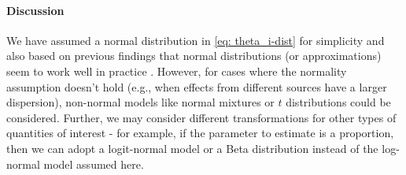 \documentclass{article}
\begin{document}
\paragraph{Discussion} 
We have assumed a normal distribution in \eqref{eq: theta_i-dist} for simplicity and 
also based on previous findings that normal distributions (or approximations) seem to work well in practice \citep{schuemie2018empirical,mulgrave2020bayesian}. 
However, for cases where the normality assumption doesn't hold (e.g., when effects from different sources have a larger dispersion), 
non-normal models like normal mixtures or $t$ distributions could be considered. 
Further, we may consider different transformations for other types of quantities of interest - 
for example, if the parameter to estimate is a proportion, then we can adopt a logit-normal model or a Beta distribution instead of the log-normal model assumed here.

\newpage


\end{document}
